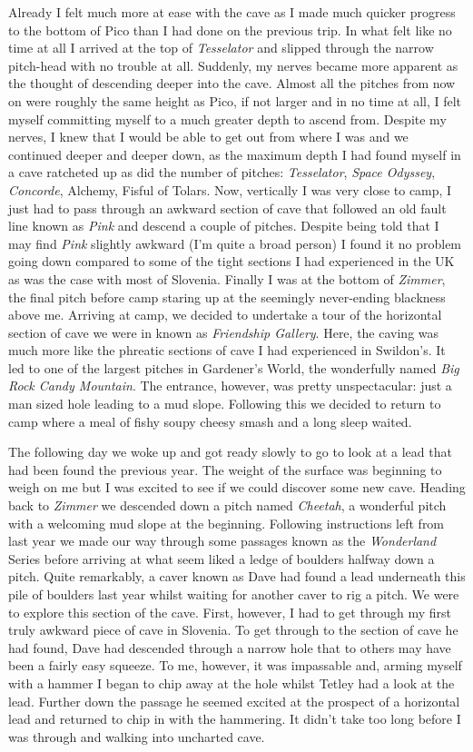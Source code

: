 Already I felt much more at ease with the cave as I made much quicker
progress to the bottom of Pico than I had done on the previous trip. In
what felt like no time at all I arrived at the top of \emph{Tesselator}
and slipped through the narrow pitch-head with no trouble at all.
Suddenly, my nerves became more apparent as the thought of descending
deeper into the cave. Almost all the pitches from now on were roughly
the same height as Pico, if not larger and in no time at all, I felt
myself committing myself to a much greater depth to ascend from. Despite
my nerves, I knew that I would be able to get out from where I was and
we continued deeper and deeper down, as the maximum depth I had found
myself in a cave ratcheted up as did the number of pitches:
\emph{Tesselator}, \emph{Space Odyssey}, \emph{Concorde}, Alchemy,
Fisful of Tolars. Now, vertically I was very close to camp, I just had
to pass through an awkward section of cave that followed an old fault
line known as \emph{Pink} and descend a couple of pitches. Despite being
told that I may find \emph{Pink} slightly awkward (I'm quite a broad
person) I found it no problem going down compared to some of the tight
sections I had experienced in the UK as was the case with most of
Slovenia. Finally I was at the bottom of \emph{Zimmer}, the final pitch
before camp staring up at the seemingly never-ending blackness above me.
Arriving at camp, we decided to undertake a tour of the horizontal
section of cave we were in known as \emph{Friendship Gallery}. Here, the
caving was much more like the phreatic sections of cave I had
experienced in Swildon's. It led to one of the largest pitches in
Gardener's World, the wonderfully named \emph{Big Rock Candy Mountain}.
The entrance, however, was pretty unspectacular: just a man sized hole
leading to a mud slope. Following this we decided to return to camp
where a meal of fishy soupy cheesy smash and a long sleep waited.

The following day we woke up and got ready slowly to go to look at a
lead that had been found the previous year. The weight of the surface
was beginning to weigh on me but I was excited to see if we could
discover some new cave. Heading back to \emph{Zimmer} we descended down
a pitch named \emph{Cheetah}, a wonderful pitch with a welcoming mud
slope at the beginning. Following instructions left from last year we
made our way through some passages known as the \emph{Wonderland} Series
before arriving at what seem liked a ledge of boulders halfway down a
pitch. Quite remarkably, a caver known as Dave had found a lead
underneath this pile of boulders last year whilst waiting for another
caver to rig a pitch. We were to explore this section of the cave.
First, however, I had to get through my first truly awkward piece of
cave in Slovenia. To get through to the section of cave he had found,
Dave had descended through a narrow hole that to others may have been a
fairly easy squeeze. To me, however, it was impassable and, arming
myself with a hammer I began to chip away at the hole whilst Tetley had
a look at the lead. Further down the passage he seemed excited at the
prospect of a horizontal lead and returned to chip in with the
hammering. It didn't take too long before I was through and walking into
uncharted cave.

